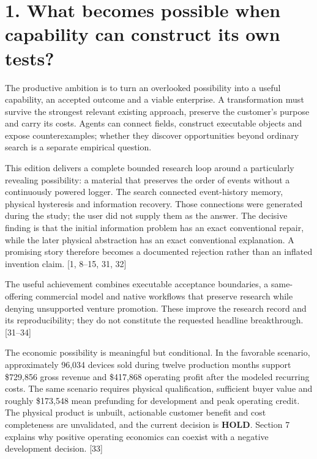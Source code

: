 \documentclass[
  11pt,
]{article}
\begin{document}
\hypertarget{what-becomes-possible-when-capability-can-construct-its-own-tests}{%
\section{1. What becomes possible when capability can construct its own
tests?}\label{what-becomes-possible-when-capability-can-construct-its-own-tests}}

The productive ambition is to turn an overlooked possibility into a
useful capability, an accepted outcome and a viable enterprise. A
transformation must survive the strongest relevant existing approach,
preserve the customer's purpose and carry its costs. Agents can connect
fields, construct executable objects and expose counterexamples; whether
they discover opportunities beyond ordinary search is a separate
empirical question.

This edition delivers a complete bounded research loop around a
particularly revealing possibility: a material that preserves the order
of events without a continuously powered logger. The search connected
event-history memory, physical hysteresis and information recovery.
Those connections were generated during the study; the user did not
supply them as the answer. The decisive finding is that the initial
information problem has an exact conventional repair, while the later
physical abstraction has an exact conventional explanation. A promising
story therefore becomes a documented rejection rather than an inflated
invention claim. {[}1, 8--15, 31, 32{]}

The useful achievement combines executable acceptance boundaries, a
same-offering commercial model and native workflows that preserve
research while denying unsupported venture promotion. These improve the
research record and its reproducibility; they do not constitute the
requested headline breakthrough. {[}31--34{]}

The economic possibility is meaningful but conditional. In the favorable
scenario, approximately 96,034 devices sold during twelve production
months support \$729,856 gross revenue and \$417,868 operating profit
after the modeled recurring costs. The same scenario requires physical
qualification, sufficient buyer value and roughly \$173,548 mean
prefunding for development and peak operating credit. The physical
product is unbuilt, actionable customer benefit and cost completeness
are unvalidated, and the current decision is \textbf{HOLD}. Section 7
explains why positive operating economics can coexist with a negative
development decision. {[}33{]}
\end{document}
